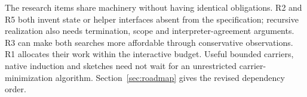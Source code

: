 The research items share machinery without having identical obligations.
R2 and R5 both invent state or helper interfaces absent from the specification;
recursive realization also needs termination, scope and interpreter-agreement
arguments. R3 can make both searches more affordable through conservative
observations. R1 allocates their work within the interactive budget.
Useful bounded carriers, native induction and sketches need not wait for an
unrestricted carrier-minimization algorithm. Section~\ref{sec:roadmap} gives
the revised dependency order.
